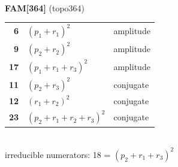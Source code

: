 \documentclass[10pt]{article}
\begin{document}
\begin{minipage}[t]{0.48\textwidth}
{}\\[2mm]\textbf{FAM[364]} (topo364)\\[2pt]{\footnotesize\begin{tabular}{@{}r@{\ \ }l@{\ \ }l@{}}\textbf{6} & $(p_1+r_1)^2$ & amplitude\\
\textbf{9} & $(p_2+r_2)^2$ & amplitude\\
\textbf{17} & $(p_1+r_1+r_3)^2$ & amplitude\\
\textbf{11} & $(p_2+r_3)^2$ & conjugate\\
\textbf{12} & $(r_1+r_2)^2$ & conjugate\\
\textbf{23} & $(p_2+r_1+r_2+r_3)^2$ & conjugate\\\end{tabular}}\\[2pt]{\scriptsize irreducible numerators: 18 = $(p_2+r_1+r_3)^2$}\end{minipage}\hfill%
\end{document}
